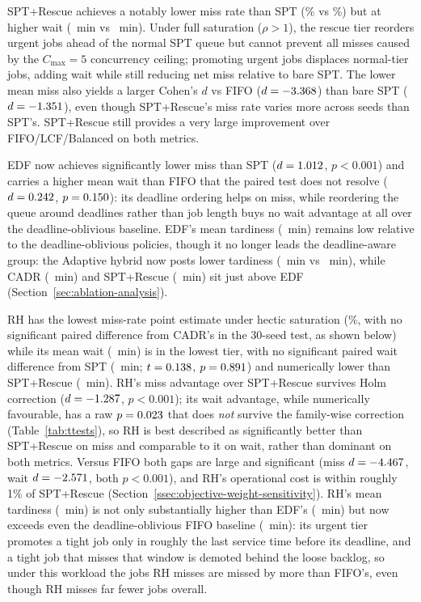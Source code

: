 {SPT+Rescue achieves a notably lower miss rate than SPT (\RescueMiss\% vs \SPTmiss\%) but at higher wait (\RescueWait~min vs \SPTwait~min). Under full saturation ($\rho>1$), the rescue tier reorders urgent jobs ahead of the normal SPT queue but cannot prevent all misses caused by the $C_{\max}=5$ concurrency ceiling; promoting urgent jobs displaces normal-tier jobs, adding wait while still reducing net miss relative to bare SPT. The lower mean miss also yields a larger Cohen's $d$ vs FIFO ($d=-3.368$) than bare SPT ($d=-1.351$), even though SPT+Rescue's miss rate varies more across seeds than SPT's. SPT+Rescue still provides a very large improvement over FIFO/LCF/Balanced on both metrics.

EDF now achieves significantly lower miss than SPT ($d=1.012$, $p<0.001$) and carries a higher mean wait than FIFO that the paired test does not resolve ($d=0.242$, $p=0.150$): its deadline ordering helps on miss, while reordering the queue around deadlines rather than job length buys no wait advantage at all over the deadline-oblivious baseline. EDF's mean tardiness (\EDFtard~min) remains low relative to the deadline-oblivious policies, though it no longer leads the deadline-aware group: the Adaptive hybrid now posts lower tardiness (\AdaptiveTard~min vs \EDFtard~min), while CADR (\CADRtard~min) and SPT+Rescue (\RescueTard~min) sit just above EDF (Section~\ref{sec:ablation-analysis}).

RH has the lowest miss-rate point estimate under hectic saturation (\RHMiss\%, with no significant paired difference from CADR's in the 30-seed test, as shown below) while its mean wait (\RHWait~min) is in the lowest tier, with no significant paired wait difference from SPT (\SPTwait~min; $t=0.138$, $p=0.891$) and numerically lower than SPT+Rescue (\RescueWait~min). RH's miss advantage over SPT+Rescue survives Holm correction ($d=-1.287$, $p<0.001$); its wait advantage, while numerically favourable, has a raw $p=0.023$ that does \emph{not} survive the family-wise correction (Table~\ref{tab:ttests}), so RH is best described as significantly better than SPT+Rescue on miss and comparable to it on wait, rather than dominant on both metrics. Versus FIFO both gaps are large and significant (miss $d=-4.467$, wait $d=-2.571$, both $p<0.001$), and RH's operational cost is within roughly 1\% of SPT+Rescue (Section~\ref{ssec:objective-weight-sensitivity}). RH's mean tardiness (\RHtard~min) is not only substantially higher than EDF's (\EDFtard~min) but now exceeds even the deadline-oblivious FIFO baseline (\FIFOtard~min): its urgent tier promotes a tight job only in roughly the last service time before its deadline, and a tight job that misses that window is demoted behind the loose backlog, so under this workload the jobs RH misses are missed by more than FIFO's, even though RH misses far fewer jobs overall.

}
